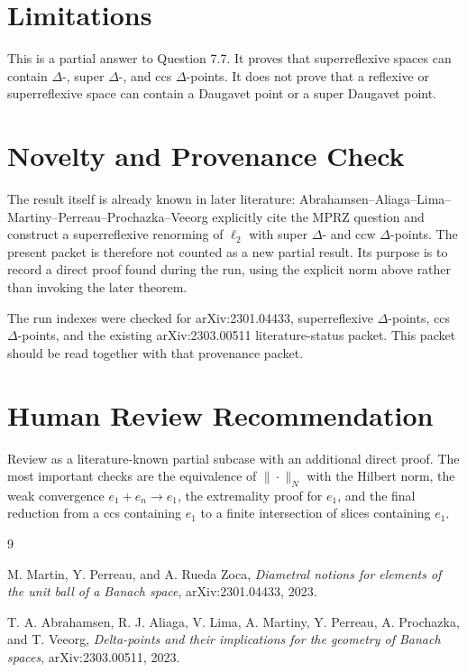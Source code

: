 \documentclass[11pt]{article}
\begin{document}
\section*{Limitations}

This is a partial answer to Question 7.7.  It proves that superreflexive
spaces can contain \(\Delta\)-, super \(\Delta\)-, and ccs
\(\Delta\)-points.  It does not prove that a reflexive or superreflexive
space can contain a Daugavet point or a super Daugavet point.

\section*{Novelty and Provenance Check}

The result itself is already known in later literature:
Abrahamsen--Aliaga--Lima--Martiny--Perreau--Prochazka--Veeorg
\cite{AALMPPV} explicitly cite the MPRZ question and construct a
superreflexive renorming of \(\ell_2\) with super \(\Delta\)- and ccw
\(\Delta\)-points.  The present packet is therefore not counted as a new
partial result.  Its purpose is to record a direct proof found during the run,
using the explicit norm above rather than invoking the later theorem.

The run indexes were checked for arXiv:2301.04433, superreflexive
\(\Delta\)-points, ccs \(\Delta\)-points, and the existing
arXiv:2303.00511 literature-status packet.  This packet should be read
together with that provenance packet.

\section*{Human Review Recommendation}

Review as a literature-known partial subcase with an additional direct proof.
The most
important checks are the equivalence of \(\|\cdot\|_N\) with the Hilbert norm,
the weak convergence \(e_1+e_n\to e_1\), the extremality proof for \(e_1\),
and the final reduction from a ccs containing \(e_1\) to a finite intersection
of slices containing \(e_1\).

\begin{thebibliography}{9}

M. Martin, Y. Perreau, and A. Rueda Zoca,
\emph{Diametral notions for elements of the unit ball of a Banach space},
arXiv:2301.04433, 2023.

T. A. Abrahamsen, R. J. Aliaga, V. Lima, A. Martiny, Y. Perreau,
A. Prochazka, and T. Veeorg,
\emph{Delta-points and their implications for the geometry of Banach spaces},
arXiv:2303.00511, 2023.

\end{thebibliography}
\end{document}
